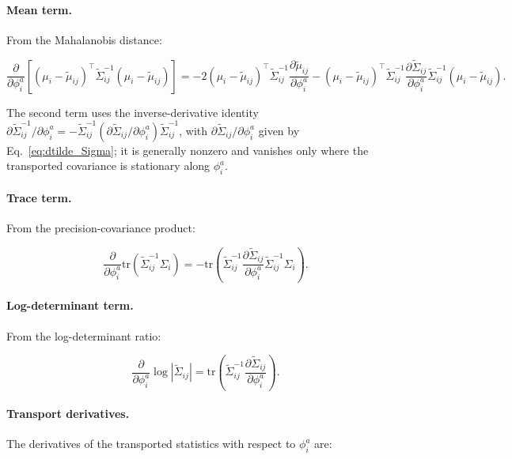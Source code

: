 \documentclass[twoside,11pt]{article}
\begin{document}
\paragraph{Mean term.} From the Mahalanobis distance:

\begin{equation}
\frac{\partial}{\partial \phi_i^a}\left[(\mu_i - \tilde{\mu}_{ij})^\top \tilde{\Sigma}_{ij}^{-1}(\mu_i - \tilde{\mu}_{ij})\right]
= -2(\mu_i - \tilde{\mu}_{ij})^\top \tilde{\Sigma}_{ij}^{-1} \frac{\partial \tilde{\mu}_{ij}}{\partial \phi_i^a}
- (\mu_i - \tilde{\mu}_{ij})^\top \tilde{\Sigma}_{ij}^{-1} \frac{\partial \tilde{\Sigma}_{ij}}{\partial \phi_i^a} \tilde{\Sigma}_{ij}^{-1} (\mu_i - \tilde{\mu}_{ij}).
\label{eq:mean_term_phi}
\end{equation}

The second term uses the inverse-derivative identity $\partial\tilde{\Sigma}_{ij}^{-1}/\partial\phi_i^a = -\tilde{\Sigma}_{ij}^{-1}(\partial\tilde{\Sigma}_{ij}/\partial\phi_i^a)\tilde{\Sigma}_{ij}^{-1}$, with $\partial\tilde{\Sigma}_{ij}/\partial\phi_i^a$ given by Eq.~\eqref{eq:dtilde_Sigma}; it is generally nonzero and vanishes only where the transported covariance is stationary along $\phi_i^a$.

\paragraph{Trace term.} From the precision-covariance product:

\begin{equation}
\frac{\partial}{\partial \phi_i^a}\mathrm{tr}(\tilde{\Sigma}_{ij}^{-1}\Sigma_i)
= -\mathrm{tr} \left(\tilde{\Sigma}_{ij}^{-1} \frac{\partial \tilde{\Sigma}_{ij}}{\partial \phi_i^a} \tilde{\Sigma}_{ij}^{-1} \Sigma_i\right).
\label{eq:trace_term_phi}
\end{equation}

\paragraph{Log-determinant term.} From the log-determinant ratio:

\begin{equation}
\frac{\partial}{\partial \phi_i^a}\log|\tilde{\Sigma}_{ij}|
= \mathrm{tr} \left(\tilde{\Sigma}_{ij}^{-1} \frac{\partial \tilde{\Sigma}_{ij}}{\partial \phi_i^a}\right).
\label{eq:logdet_term_phi}
\end{equation}

\paragraph{Transport derivatives.} The derivatives of the transported statistics with respect to $\phi_i^a$ are:
\end{document}

